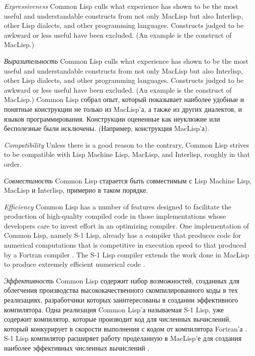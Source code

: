 \begin{flushdesc}
\item[\textit{Expressiveness}]
Common Lisp culls what
experience has shown to be the most useful and understandable constructs
from not only MacLisp but also
Interlisp, other Lisp dialects, and other programming languages.
Constructs judged to be awkward or less useful have been
excluded.   (An example is the  construct of MacLisp.)

\item[\textit{Выразительность}]
Common Lisp culls what
experience has shown to be the most useful and understandable constructs
from not only MacLisp but also
Interlisp, other Lisp dialects, and other programming languages.
Constructs judged to be awkward or less useful have been
excluded.   (An example is the  construct of MacLisp.)
Common Lisp собрал опыт, который показывает наиболее удобные и
понятные конструкции не только из MacLisp'а, а также из других
диалектов, и языков программирования. Конструкции оцененные как
неуклюжие или бесполезные были исключены. (Например, 
конструкция MacLisp'а).

\item[\textit{Compatibility}]
Unless there is a good reason to the contrary,
Common Lisp strives to be compatible with Lisp Machine Lisp, MacLisp, and
Interlisp, roughly in that order.

\item[\textit{Совместимость}]
Common Lisp старается быть совместимым с Lisp Machine Lisp,
MacLisp и Interlisp, примерно в таком порядке.

\item[\textit{Efficiency}]
Common Lisp has a number of features designed to
facilitate the production of high-quality compiled code in those
implementations whose developers
care to invest effort in an optimizing compiler.
One implementation of Common Lisp, namely S-1 Lisp, already has a compiler
that produces code for numerical computations that is competitive
in execution speed to that produced by a Fortran compiler \cite{S1-COMPILER}.
The S-1 Lisp compiler
extends the work done in MacLisp to produce extremely efficient
numerical code \cite{MACLISP-BEATS-FORTRAN}.

\item[\textit{Эффективность}]
Common Lisp содержит набор возможностей, созданных для облегчения
производства высококачественного скомпилированного коды в тех
реализациях, разработчики которых заинтересованы в создании
эффективного компилятора. Одна реализация Common Lisp'а называемая
S-1 Lisp, уже содержит компилятор, которые производит код для
численных вычислений, который конкурирует в скорости выполнения
с кодом от компилятора Fortran'а \cite{S1-COMPILER}. S-1 Lisp
компилятор расширяет работу проделанную в MacLisp'е для создания
наиболее эффективных численных вычислений \cite{MACLISP-BEATS-FORTRAN}.


\end{flushdesc}
